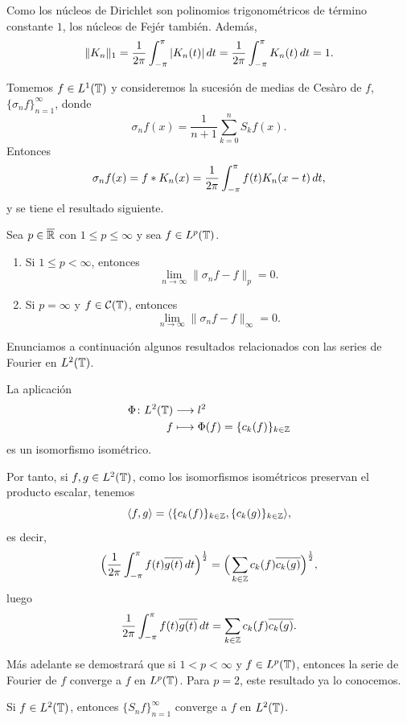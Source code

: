 \documentclass[a4paper, 12pt, oneside]{book}
\begin{document}
Como los núcleos de Dirichlet son polinomios trigonométricos de término constante $1$, los núcleos de Fejér también. Además,
\[\|K_n\|_1 = \frac{1}{2\pi}\int_{-\pi}^{\pi} |K_n(t)| \, dt =  \frac{1}{2\pi}\int_{-\pi}^{\pi} K_n(t) \, dt = 1.\]

Tomemos $f \in L^1(\mathbb T)$ y consideremos la sucesión de medias de Cesàro de $f$, $\{\sigma_nf\}_{n=1}^\infty$, donde
\[\sigma_nf(x) = \frac{1}{n+1}\sum_{k=0}^nS_kf(x).\]
Entonces
\[\sigma_nf(x) = f \ast K_n(x) = \frac{1}{2\pi}\int_{-\pi}^{\pi} f(t)K_n(x-t) \, dt,\]
y se tiene el resultado siguiente.

\begin{theorem}\label{1.2.6}
    Sea $p \in \overline{\mathbb R}$ con $1 \leq p \leq \infty$ y sea $f \in L^p(\mathbb T)$.
    \begin{enumerate}
        \item Si $1 \leq p < \infty$, entonces
        \[\lim_{n \to \infty} \|\sigma_nf - f\|_p = 0.\]
        \item Si $p = \infty$ y $f \in \mathcal{C}(\mathbb T)$, entonces
        \[\lim_{n \to \infty} \|\sigma_nf - f\|_\infty = 0.\]
    \end{enumerate}
\end{theorem}

Enunciamos a continuación algunos resultados relacionados con las series de Fourier en $L^2(\mathbb T)$.

\begin{theorem}
    La aplicación
    \begin{align*}
        \Phi \colon L^2(\mathbb T) &\longrightarrow l^2 \\
        f &\longmapsto \Phi(f) = \{c_k(f)\}_{k\in\mathbb Z}
    \end{align*}
    es un isomorfismo isométrico.
\end{theorem}

Por tanto, si $f,g \in L^2(\mathbb T)$, como los isomorfismos isométricos preservan el producto escalar, tenemos
\[\langle f,g \rangle = \langle \{c_k(f)\}_{k\in\mathbb Z}, \{c_k(g)\}_{k\in\mathbb Z} \rangle,\]
es decir,
\[\Bigl(\frac{1}{2\pi}\int_{-\pi}^{\pi} f(t)\overline{g(t)} \, dt\Bigr)^{\frac{1}{2}} = \Bigl(\,\sum_{k\in\mathbb Z} c_k(f)\overline{c_k(g)}\Bigr)^{\frac{1}{2}},\]
luego
\begin{equation}\label{1.2.8}
    \frac{1}{2\pi}\int_{-\pi}^{\pi} f(t)\overline{g(t)} \, dt = \sum_{k\in\mathbb Z} c_k(f)\overline{c_k(g)}.
\end{equation}

Más adelante se demostrará que si $1<p<\infty$ y $f\in L^p(\mathbb T)$, entonces la serie de Fourier de $f$ converge a $f$ en $L^p(\mathbb T)$. Para $p=2$, este resultado ya lo conocemos.
\begin{theorem}
    Si $f \in L^2(\mathbb T)$, entonces $\{S_nf\}_{n=1}^\infty$ converge a $f$ en $L^2(\mathbb T)$.
\end{theorem}
\end{document}
